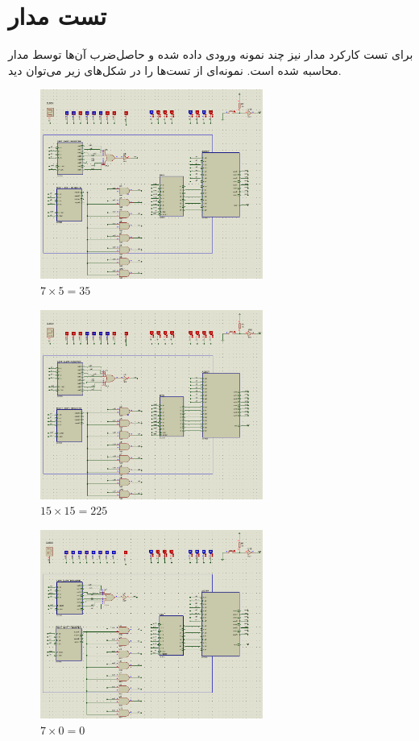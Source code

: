 \documentclass[12pt,onecolumn,a4paper,fleqn]{article}
\begin{document}
	\section{تست مدار}
	برای تست کارکرد مدار نیز چند نمونه ورودی داده شده و حاصل‌ضرب آن‌ها توسط مدار محاسبه شده است. نمونه‌ای از تست‌ها را در شکل‌های زیر می‌توان دید.
	\begin{figure}[H]
		\centering
		\includegraphics[width=0.65\textwidth]{source/test1.png}
		\caption{$7 \times 5 = 35$}
	\end{figure}
	\begin{figure}[H]
		\centering
		\includegraphics[width=0.65\textwidth]{source/test2.png}
		\caption{$15 \times 15 = 225$}
	\end{figure}
	\begin{figure}[H]
		\centering
		\includegraphics[width=0.65\textwidth]{source/test3.png}
		\caption{$7\times 0 = 0$}
	\end{figure}
\end{document}
